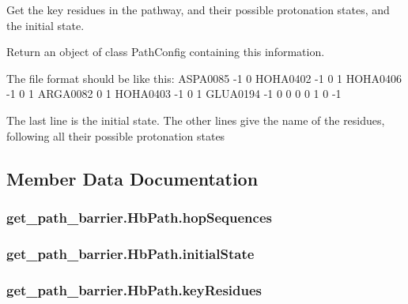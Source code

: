 Get the key residues in the pathway, and their possible protonation states, and the initial state. 

Return an object of class Path\-Config containing this information. \begin{DoxyVerb}    The file format should be like this:
    ASPA0085  -1  0
    HOHA0402  -1  0  1
    HOHA0406  -1  0  1
    ARGA0082   0  1
    HOHA0403  -1  0  1
    GLUA0194  -1  0
     0 0 0 1 0 -1

     The last line is the initial state.
     The other lines give the name of the residues, following all their possible protonation states\end{DoxyVerb}
 

\subsection{Member Data Documentation}
\hypertarget{classget__path__barrier_1_1_hb_path_a838cc727a1853ae9dbcda45158c4ff1d}{
\subsubsection[{hop\-Sequences}]{\setlength{\rightskip}{0pt plus 5cm}get\-\_\-path\-\_\-barrier.\-Hb\-Path.\-hop\-Sequences}}\label{classget__path__barrier_1_1_hb_path_a838cc727a1853ae9dbcda45158c4ff1d}
\hypertarget{classget__path__barrier_1_1_hb_path_acb500e7ef9452b85d3a037ae96b952d3}{
\subsubsection[{initial\-State}]{\setlength{\rightskip}{0pt plus 5cm}get\-\_\-path\-\_\-barrier.\-Hb\-Path.\-initial\-State}}\label{classget__path__barrier_1_1_hb_path_acb500e7ef9452b85d3a037ae96b952d3}
\hypertarget{classget__path__barrier_1_1_hb_path_af574f30a4a9297c5b798a9f5ab93429c}{
\subsubsection[{key\-Residues}]{\setlength{\rightskip}{0pt plus 5cm}get\-\_\-path\-\_\-barrier.\-Hb\-Path.\-key\-Residues}}\label{classget__path__barrier_1_1_hb_path_af574f30a4a9297c5b798a9f5ab93429c}

